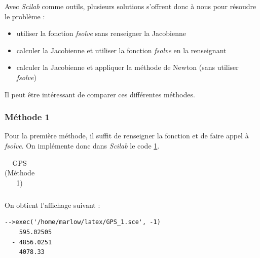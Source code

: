 \documentclass[a4paper,10pt]{report}
\begin{document}
\indent Avec \textit{Scilab} comme outils, plusieurs solutions s'offrent donc à nous pour résoudre le problème :
\begin{itemize}
\item utiliser la fonction \textit{fsolve} sans renseigner la Jacobienne
\item calculer la Jacobienne et utiliser la fonction \textit{fsolve} en la renseignant
\item calculer la Jacobienne et appliquer la méthode de Newton (sans utiliser \textit{fsolve})
\end{itemize}
Il peut être intéressant de comparer ces différentes méthodes.

\subsubsection{Méthode 1}
Pour la première méthode, il suffit de renseigner la fonction et de faire appel à \textit{fsolve}. On implémente donc dans \textit{Scilab} le code \ref{GPS1}.

\begin{table}[H]
\caption{GPS (Méthode 1)}
\begin{tabular}{l}
\\
\end{tabular}
\label{GPS1}
\end{table}

On obtient l'affichage suivant : \begin{verbatim}
-->exec('/home/marlow/latex/GPS_1.sce', -1)
    595.02505  
  - 4856.0251  
    4078.33
\end{verbatim}
\end{document}
